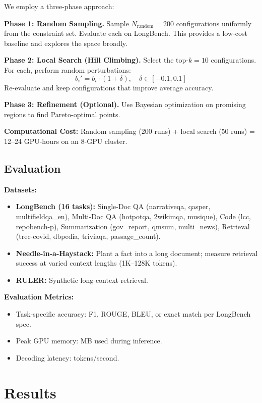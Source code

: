 \documentclass[11pt]{article}
\begin{document}
We employ a three-phase approach:

\textbf{Phase 1: Random Sampling.}
Sample $N_{\text{random}} = 200$ configurations uniformly from the constraint set. Evaluate each on LongBench. This provides a low-cost baseline and explores the space broadly.

\textbf{Phase 2: Local Search (Hill Climbing).}
Select the top-$k=10$ configurations. For each, perform random perturbations:
\[
b_i' = b_i \cdot (1 + \delta), \quad \delta \in [-0.1, 0.1]
\]
Re-evaluate and keep configurations that improve average accuracy.

\textbf{Phase 3: Refinement (Optional).}
Use Bayesian optimization on promising regions to find Pareto-optimal points.

\textbf{Computational Cost:}
Random sampling (200 runs) + local search (50 runs) = 12–24 GPU-hours on an 8-GPU cluster.

\subsection{Evaluation}

\textbf{Datasets:}
\begin{itemize}
    \item \textbf{LongBench (16 tasks):} Single-Doc QA (narrativeqa, qasper, multifieldqa\_en), Multi-Doc QA (hotpotqa, 2wikimqa, musique), Code (lcc, repobench-p), Summarization (gov\_report, qmsum, multi\_news), Retrieval (trec-covid, dbpedia, triviaqa, passage\_count).
    \item \textbf{Needle-in-a-Haystack:} Plant a fact into a long document; measure retrieval success at varied context lengths (1K–128K tokens).
    \item \textbf{RULER:} Synthetic long-context retrieval.
\end{itemize}

\textbf{Evaluation Metrics:}
\begin{itemize}
    \item Task-specific accuracy: F1, ROUGE, BLEU, or exact match per LongBench spec.
    \item Peak GPU memory: MB used during inference.
    \item Decoding latency: tokens/second.
\end{itemize}

\section{Results}
\end{document}

